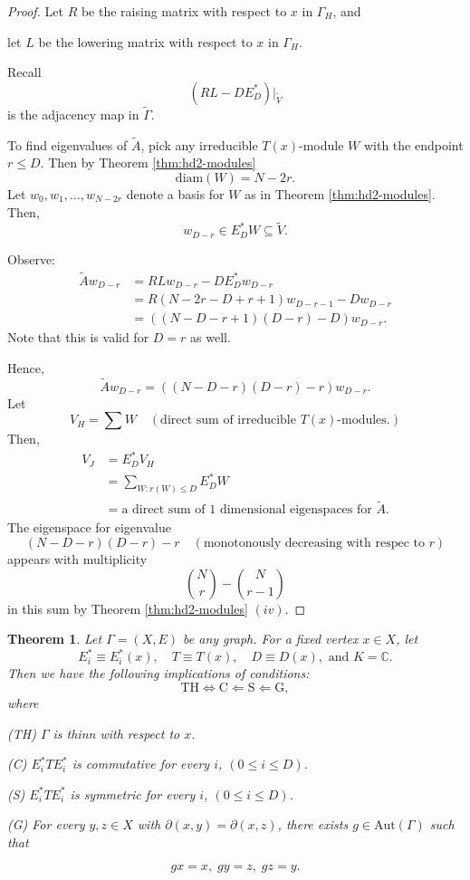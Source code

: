 \documentclass[
]{book}
\newtheorem{theorem}{Theorem}[chapter]
\theoremstyle{definition}
\theoremstyle{definition}
\theoremstyle{definition}
\theoremstyle{definition}
\theoremstyle{remark}
\begin{document}
\begin{proof}
Let \(R\) be the raising matrix with respect to \(x\) in \(\Gamma_H\), and

let \(L\) be the lowering matrix with respect to \(x\) in \(\Gamma_H\).

Recall
\[(RL - DE^*_D) |_{\tilde{V}}\]
is the adjacency map in \(\tilde{\Gamma}\).

To find eigenvalues of \(\tilde{A}\), pick any irreducible \(T(x)\)-module \(W\) with the endpoint \(r\leq D\). Then by Theorem \ref{thm:hd2-modules}
\[\text{diam}(W) = N-2r.\]
Let \(w_0, w_1, \ldots, w_{N-2r}\) denote a basis for \(W\) as in Theorem \ref{thm:hd2-modules}. Then,
\[w_{D-r} \in E^*_DW \subseteq \tilde{V}.\]

Observe:
\begin{align}
\tilde{A}w_{D-r} & = RLw_{D-r} - DE_D^*w_{D-r}\\
& = R(N-2r-D+r+1)w_{D-r-1} - Dw_{D-r}\\
& = ((N-D-r+1)(D-r) - D)w_{D-r}.
\end{align}
Note that this is valid for \(D = r\) as well.

Hence,
\[\tilde{A}w_{D-r}  = ((N-D-r)(D-r)-r)w_{D-r}.\]
Let
\[V_H = \sum W \quad (\text{direct sum of irreducible }T(x)\text{-modules}.)\]
Then,
\begin{align}
V_J & = E_D^*V_H\\
& = \sum_{W:r(W)\leq D} E_D^*W\\
& = \text{a direct sum of 1 dimensional eigenspaces for }\tilde{A}.
\end{align}
The eigenspace for eigenvalue
\[(N-D-r)(D-r)-r \quad (\text{monotonously decreasing with respec to }r)\]
appears with multiplicity
\[\binom{N}{r} - \binom{N}{r-1}\]
in this sum by Theorem \ref{thm:hd2-modules} \((iv)\).
\end{proof}

\begin{theorem}
\protect\hypertarget{thm:thin-condition}{}\label{thm:thin-condition}Let \(\Gamma = (X, E)\) be any graph. For a fixed vertex \(x\in X\), let
\[E_i^*\equiv E_i^*(x), \quad T\equiv T(x), \quad D \equiv D(x), \text{ and } K = \mathbb{C}.\]
Then we have the following implications of conditions:
\[\text{TH} \Leftrightarrow \text{C} \Leftarrow \text{S} \Leftarrow \text{G},\]
where

(TH) \(\Gamma\) is thinn with respect to \(x\).

(C) \(E^*_iTE^*_i\) is commutative for every \(i\), \((0\leq i \leq D)\).

(S) \(E^*_iTE^*_i\) is symmetric for every \(i\), \((0\leq i \leq D)\).

(G) For every \(y, z\in X\) with \(\partial(x,y) = \partial(x,z)\), there exists \(g\in \mathrm{Aut}(\Gamma)\) such that

\[gx = x, \; gy = z, \; gz = y.\]
\end{theorem}
\end{document}
